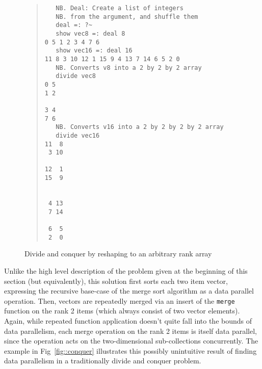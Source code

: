\begin{figure}[pht]
\begin{quote}
\begin{singlespacing}
\begin{small}
\begin{verbatim}
   NB. Deal: Create a list of integers
   NB. from the argument, and shuffle them
   deal =: ?~
   show vec8 =: deal 8
0 5 1 2 3 4 7 6
   show vec16 =: deal 16
11 8 3 10 12 1 15 9 4 13 7 14 6 5 2 0
   NB. Converts v8 into a 2 by 2 by 2 array
   divide vec8
0 5
1 2

3 4
7 6
   NB. Converts v16 into a 2 by 2 by 2 by 2 array
   divide vec16
11  8
 3 10

12  1
15  9


 4 13
 7 14

 6  5
 2  0
\end{verbatim}
\end{small}
\end{singlespacing}
\end{quote}
\caption{Divide and conquer by reshaping to an arbitrary rank array}
\label{fig::divide}
\end{figure}

Unlike the high level description of the problem given at the beginning of this section (but equivalently), 
this solution first sorts each two item vector, 
expressing the recursive base-case of the merge sort algorithm as a data parallel operation.
Then, vectors are repeatedly merged via an insert of the \texttt{merge} function on the rank 2 items 
(which always consist of two vector elements).
Again, while repeated function application doesn't quite fall into the bounds of data parallelism, 
each merge operation on the rank 2 items is itself data parallel, 
since the operation acts on the two-dimensional sub-collections concurrently. 
The example in Fig~\ref{fig::conquer} illustrates this possibly unintuitive result of finding data parallelism 
in a traditionally divide and conquer problem.

